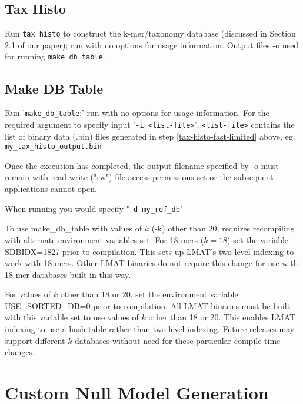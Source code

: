 \documentclass[11pt]{article}
\begin{document}
\subsection{Tax Histo}
\label{tax-histo}
 Run \texttt{tax\_histo} to construct the k-mer/taxonomy database
   (discussed in Section 2.1 of our paper); run with no options for usage
   information. Output files -o used for running \texttt{make\_db\_table}.



\subsection{Make DB Table}
\label{sec:make-db}
Run '\texttt{make\_db\_table};' run with no options for usage information.
   For the required argument to specify input '\texttt{-i <list-file>}', \texttt{<list-file>} contains the list of binary data (.bin) files generated in step \ref{tax-histo-fast-limited} above, eg. \texttt{my\_tax\_histo\_output.bin}

 Once the execution has completed, the output filename specified by -o must remain with read-write ("rw") file access permissions set or the subsequent applications cannot open.

   When running   you would specify "\texttt{-d my\_ref\_db}"  

 To use make\_db\_table with values of $k$ (-k) other than 20, requires
 recompiling with alternate environment variables set.  For 18-mers
 ($k=18$) set the variable SDBIDX=1827 prior to compilation.  This sets up LMAT's
 two-level indexing to work with 18-mers.  Other LMAT binaries do not
 require this change for use with 18-mer databases built in this way.

For values of $k$ other than 18 or 20, set the environment variable
 USE_SORTED_DB=0 prior to compilation.  All LMAT binaries must be
 built with this variable set to use values of $k$ other than 18 or
 20.  This enables LMAT indexing to use a hash table rather than two-level indexing.  Future releases may support different $k$ databases without need for
 these particular compile-time changes.


\section{Custom Null Model Generation}
\label{sec:nullmodel}
\end{document}
